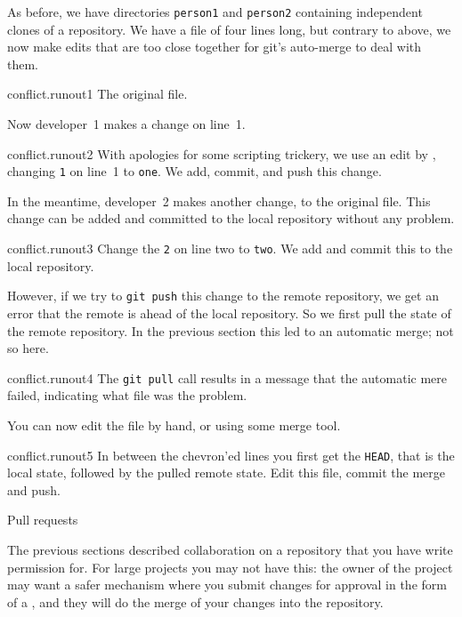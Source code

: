 As before, we have directories \lstinline{person1} and \lstinline{person2}
containing independent clones of a repository.
We have a file of four lines long, but contrary to above,
we now make edits that are too close together for git's
auto-merge to deal with them.

\begin{gitstep}{conflict.runout1}
  The original file.
\end{gitstep}

Now developer~1 makes a change on line~1.

\begin{gitstep}{conflict.runout2}
  With apologies for some scripting trickery,
  we use an edit by , changing \lstinline{1} on line~1 to \lstinline{one}.
  We add, commit, and push this change.
\end{gitstep}

In the meantime, developer~2 makes another change, to the original file.
This change can be added and committed to the local repository
without any problem.

\begin{gitstep}{conflict.runout3}
  Change the \lstinline{2} on line two to \lstinline{two}.
  We add and commit this to the local repository.
\end{gitstep}

However, if we try to \lstinline{git push} this change to the remote repository,
we get an error that the remote is ahead of the local repository.
So we first pull the state of the remote repository.
In the previous section this led to an automatic merge;
not so here.

\begin{gitstep}{conflict.runout4}
  The \lstinline{git pull} call results in a message that the automatic mere failed,
  indicating what file was the problem.
\end{gitstep}

You can now edit the file by hand, or using some merge tool.

\begin{gitstep}{conflict.runout5}
  In between the chevron'ed lines you first get the \lstinline{HEAD},
  that is the local state, followed by the pulled remote state.
  Edit this file, commit the merge and push.
\end{gitstep}

 {Pull requests}

The previous sections described collaboration on a repository
that you have write permission for.
For large projects you may not have this:
the owner of the project may want a safer mechanism
where you submit changes for approval
in the form of a , and
they will do the merge of your changes into the repository.


